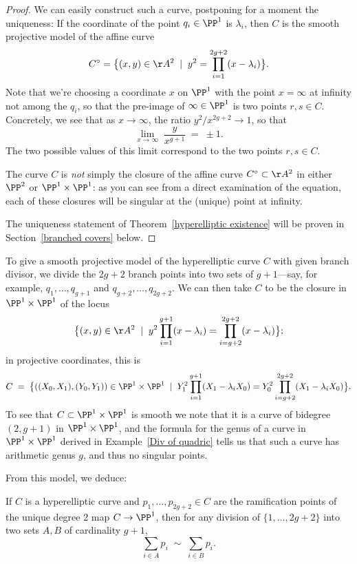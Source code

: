 \begin{proof} 
We can easily construct such a curve, postponing for a moment the uniqueness:
If the coordinate of the point $q_i \in \PP^1$ is $\lambda_i$, then $C$ is the smooth projective model of the affine curve 
  $$
C^\circ = \big\{ (x,y) \in \AA^2 \; \mid \; y^2 = \prod_{i=1}^{2g+2} (x - \lambda_i) \big\}.
$$ 
Note that we're choosing a coordinate $x$ on $\PP^1$ with the point $x = \infty$ at infinity not among the $q_i$, so that the pre-image of $\infty \in \PP^1$ is two points $r, s \in C$. Concretely, we see that as $x \to \infty$, the ratio $y^2/x^{2g+2} \to 1$, so that 
$$
\lim_{x \to \infty} \; \frac{y}{x^{g+1}} \; = \; \pm 1.
$$
  The two possible values of this limit correspond to the two points $r,s \in C$.
  
The curve $C$ is \emph{not} simply the closure of the affine curve $C^\circ \subset \AA^2$ in either $\PP^2$ or $\PP^1 \times \PP^1$: as you can see from a direct examination of the equation, each of these closures will be singular at the (unique) point at infinity.
  
The uniqueness statement of Theorem~\ref{hyperelliptic existence} will be proven in Section~\ref{branched covers} below.
 \end{proof}
To give a smooth projective model of the hyperelliptic curve $C$ with given branch divisor, we divide the $2g+2$ branch points  into two sets of $g+1$---say, for example, $q_1,\dots,q_{g+1}$ and $q_{g+2}, \dots, q_{2g+2}$. We can then take $C$ to be the closure in $\PP^1 \times \PP^1$ of the  locus
  $$
  \big\{ (x,y) \in \AA^2 \; \mid \; y^2\prod_{i=1}^{g+1} (x - \lambda_i) = \prod_{i=g+2}^{2g+2} (x - \lambda_i) \big\};
  $$
  in projective coordinates, this is
   $$
  C \; = \; \big\{ ((X_{0},X_{1}), (Y_{0},Y_{1})) \in \PP^1 \times \PP^1 \; \mid \; Y_1^2\prod_{i=1}^{g+1} (X_1 - \lambda_iX_0) = Y_0^2\prod_{i=g+2}^{2g+2} (X_1 - \lambda_iX_0) \big\}.
  $$
To see that $C \subset \PP^1 \times \PP^1$ is smooth we note that it is a curve of bidegree $(2,g+1)$ in $\PP^1 \times \PP^1$, and the formula for the genus of a curve in $\PP^1 \times \PP^1$ derived in Example~\ref{Div of quadric} tells us that such a curve has arithmetic genus $g$, and thus no singular points. 

From this model, we deduce:

\begin{corollary}\label{relation on ramification points}
If $C$ is a hyperelliptic curve  and $p_1,\dots,p_{2g+2} \in C$ are the ramification points of the unique degree 2 map $C \to \PP^1$, then for any division of $\{1,\dots,2g+2\}$ into two sets $A,B$ of cardinality $g+1$,
$$
\sum_{i\in A} p_{i}  \; \sim \; \sum_{i\in B}p_{i}.
$$
\end{corollary}

